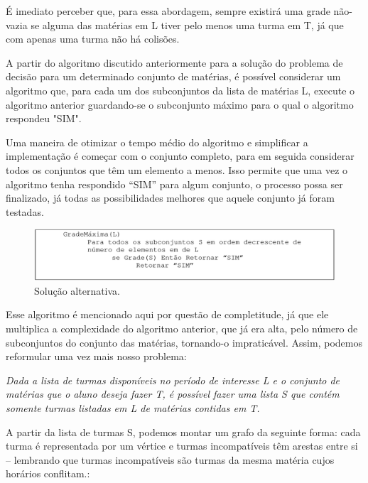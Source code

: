 \documentclass[graduacao,brazil]{ThesisPUC}
\begin{document}
É imediato perceber que, para essa abordagem, sempre existirá uma grade não-vazia se alguma das matérias em L tiver pelo menos uma turma em T, já que com apenas uma turma não há colisões.

A partir do algoritmo discutido anteriormente para a solução do problema de decisão para um determinado conjunto de matérias, é possível considerar um algoritmo que, para cada um dos subconjuntos da lista de matérias L, execute o algoritmo anterior guardando-se o subconjunto máximo para o qual o algoritmo respondeu "SIM".

Uma maneira de otimizar o tempo médio do algoritmo e simplificar a implementação é começar com o conjunto completo, para em seguida considerar todos os conjuntos que têm um elemento a menos. Isso permite que uma vez o algoritmo tenha respondido “SIM” para algum conjunto, o processo possa ser finalizado, já todas as possibilidades melhores que aquele conjunto já foram testadas.

\begin{figure}[H]
    \centering
    \includegraphics[width=\linewidth]{img/algoritmo_grade_maxima.png}
    \caption{Solução alternativa.}
\end{figure}

Esse algoritmo é mencionado aqui por questão de completitude, já que ele multiplica a complexidade do algoritmo anterior, que já era alta, pelo número de subconjuntos do conjunto das matérias, tornando-o impraticável. Assim, podemos reformular uma vez mais nosso problema:

\vspace{3 mm}
\textit{Dada a lista de turmas disponíveis no período de interesse L e o conjunto de matérias que o aluno deseja fazer T, é possível fazer uma lista S que contém somente turmas listadas em L de matérias contidas em T.}
\vspace{3 mm}

A partir da lista de turmas S, podemos montar um grafo da seguinte forma: cada turma é representada por um vértice e turmas incompatíveis têm arestas entre si – lembrando que turmas incompatíveis são turmas da mesma matéria cujos horários conflitam.:
\end{document}
